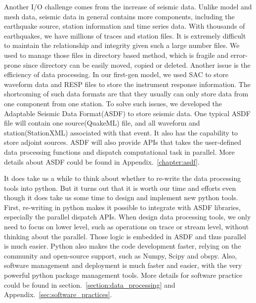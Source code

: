 Another I/O challenge comes from the increase of seismic data. Unlike model and mesh data,
seismic data in general contains more components, including the earthquake source,
station information and time series data. With thousands of earthquakes, we have millions
of traces and station files. It is extremely
difficult to maintain the relationship and integrity given such a large number files. We used to manage
those files in directory based method, which is fragile and error-prone since directory
can be easily moved, copied or deleted. Another issue is the efficiency of data processing.
In our first-gen model, we used SAC to store waveform data and RESP files to store the instrument
response information. The shortcoming of such data formats are that they usually can only store 
data from one component from one station. To solve such issues, we developed the Adaptable
Seismic Data Format(ASDF) to store seismic data. One typical ASDF file will contain one
source(QuakeML) file, and all waveform and station(StationXML) associated with that event.
It also has the capability to store adjoint sources. ASDF will also provide APIs that takes
the user-defined data processing functions and dispatch computational task in parallel.
More details about ASDF could be found in Appendix.~\ref{chapter:asdf}.

It does take us a while to think about whether to re-write the data processing tools
into python. But it turns out that it is worth our time and efforts even though it does
take us some time to design and implement new python tools. First, re-writing in python
makes it possible to integrate with ASDF libraries, especially the parallel dispatch APIs.
When design data processing tools, we only need to focus on lower level, such as
operations on trace or stream level, without thinking about the parallel. Those logic is 
embedded in ASDF and thus parallel is much easier. Python also makes the code development
faster, relying on the community and open-source support, such as Numpy, Scipy and obspy.
Also, software management and deployment is much faster and easier, with the very powerful
python package management tools. More details for software practice could be found in 
section.~\ref{section:data_processing} and Appendix.~\ref{sec:software_practices}.

